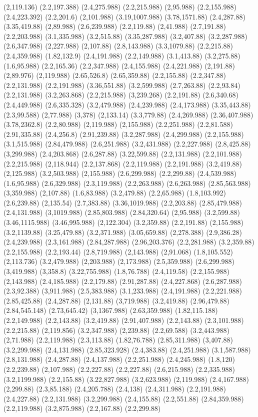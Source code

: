 \documentclass[12pt,letterpaper]{article}
\begin{document}
(2,119.136) (2.2,197.388) (2.4,275.988) (2.2,215.988) (2,95.988) (2.2,155.988) (2.4,223.392) (2.2,201.6) (2,101.988) (3.19,1007.988) (3.78,1571.88) (2.4,287.88) (3.35,419.88) (2,89.988) (2.6,239.988) (2.2,119.88) (2,41.988) (2.7,191.88) (2.2,203.988) (3.1,335.988) (3.2,515.88) (3.35,287.988) (3.2,407.88) (3.2,287.988) (2.6,347.988) (2,227.988) (2,107.88) (2.8,143.988) (3.3,1079.88) (2.2,215.88) (2.4,359.988) (1.82,132.9) (2.4,191.988) (2.2,149.988) (3.1,413.88) (3.2,275.88) (1.6,95.988) (2.2,165.36) (2.2,347.988) (2.4,155.988) (2.4,221.988) (2,191.88) (2,89.976) (2,119.988) (2.65,526.8) (2.65,359.88) (2.2,155.88) (2.2,347.88) (2.2,131.988) (2.2,191.988) (3.36,551.88) (3.2,599.988) (2.7,263.88) (2.2,93.84) (2.2,131.988) (3.2,263.868) (2.2,215.988) (3,239.268) (2.2,191.88) (2.6,340.68) (2.4,449.988) (2.6,335.328) (3.2,479.988) (2.4,239.988) (2.4,173.988) (3.35,443.88) (2.3,99.588) (2,77.988) (3,378) (2,133.14) (3.3,779.88) (2.4,269.988) (2.36,407.988) (3.78,2362.8) (2.2,80.988) (2,119.988) (2,155.988) (2.2,251.988) (2.2,81.588) (2.91,335.88) (2.4,256.8) (2.91,239.88) (3.2,287.988) (2.4,299.988) (2.2,155.988) (3.1,515.988) (2.84,479.988) (2.6,251.988) (3.2,431.988) (2.2,227.988) (2.8,425.88) (3,299.988) (2.4,203.868) (2.6,287.88) (3.22,599.88) (2.2,131.988) (2.2,101.988) (2.2,215.988) (2,118.944) (2.2,137.868) (2.2,119.988) (2.2,191.988) (3.2,419.88) (2,125.988) (3.2,503.988) (2,155.988) (2.6,299.988) (2.2,299.88) (2.4,539.988) (1.6,95.988) (2.6,329.988) (2.3,119.988) (2.2,263.988) (2.6,263.988) (2.85,563.988) (3,359.988) (2,107.88) (1.6,83.988) (3.2,479.88) (2.2,65.988) (1.8,103.992) (2.6,239.88) (2,135.54) (2.7,383.88) (3.36,1019.988) (2.2,203.88) (2.85,479.988) (2.4,131.988) (3,1019.988) (2.85,803.988) (2.84,320.64) (2,95.988) (3.2,599.88) (3.46,1115.988) (3.46,995.988) (2,122.304) (3.2,359.88) (2.2,191.88) (2,155.988) (3.2,1139.88) (3.25,479.88) (3.2,371.988) (3.05,659.88) (2,278.388) (2.9,386.28) (2.4,239.988) (2.3,161.988) (2.84,287.988) (2.96,203.376) (2.2,281.988) (3.2,359.88) (2.2,155.988) (2.2,193.44) (2.8,719.988) (2,143.988) (2,91.068) (1.8,105.552) (2,113.736) (3.2,479.988) (2,203.988) (2,173.988) (2.5,359.988) (2.6,299.988) (3,419.988) (3,358.8) (3.22,755.988) (1.8,76.788) (2.4,119.58) (2.2,155.988) (2,143.988) (2.4,185.988) (2.2,179.88) (2.91,287.88) (2.4,227.868) (2.6,287.988) (2.3,92.388) (3,911.988) (2.5,383.988) (3.1,233.988) (2.4,191.988) (2.2,221.988) (2.85,425.88) (2.4,287.88) (2,131.88) (3,719.988) (3.2,419.88) (2.96,479.88) (2.84,545.148) (2.73,645.42) (3,1367.988) (2.63,359.988) (1.82,115.188) (2.2,149.988) (2.2,143.88) (3.2,419.88) (2.91,407.988) (2.2,143.88) (2.3,101.988) (2.2,215.88) (2,119.856) (3.2,347.988) (2,239.88) (2.2,69.588) (3.2,443.988) (2,71.988) (2.2,119.988) (2.3,113.88) (1.82,76.788) (2.85,311.988) (3,407.88) (3.2,299.988) (2.4,131.988) (2.85,323.928) (2.4,383.88) (2.4,251.988) (3.1,587.988) (2.8,131.988) (2.4,287.88) (2.4,137.988) (2.2,251.988) (2.4,245.988) (1.8,120) (2.2,239.88) (2,107.988) (2.2,227.88) (2.2,227.88) (2.6,215.988) (2.2,335.988) (3.2,1199.988) (2.2,155.88) (3.22,827.988) (3.2,623.988) (2,119.988) (2.4,167.988) (2,299.88) (2.3,85.188) (2.4,205.788) (2.4,138) (2.4,311.988) (2.2,191.988) (2.4,227.88) (2.2,131.988) (3.2,299.988) (2.4,155.88) (2.2,551.88) (2.84,359.988) (2.2,119.988) (3.2,875.988) (2.2,167.88) (2.2,299.88) 
\end{document}
